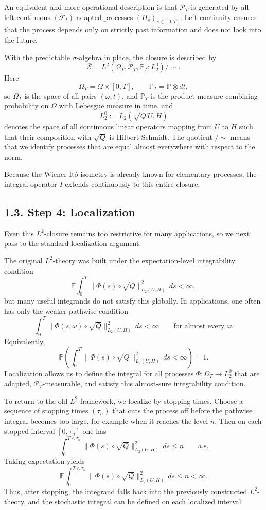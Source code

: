 \documentclass[11pt]{article}
\theoremstyle{definition}
\theoremstyle{remark}
\begin{document}
An equivalent and more operational description is that \(\mathcal P_T\) is generated by all left-continuous \((\mathcal F_t)\)-adapted processes \((H_s)_{s\in[0,T]}\). Left-continuity ensures that the process depends only on strictly past information and does not look into the future.

With the predictable \(\sigma\)-algebra in place, the closure is described by
\[
\overline{\mathcal E}
=
L^2(\Omega_T,\mathcal P_T,\mathbb P_T;L_2^0)/\sim.
\]
Here
\[
\Omega_T=\Omega\times[0,T],
\qquad
\mathbb P_T=\mathbb P\otimes dt,
\]
so \(\Omega_T\) is the space of all pairs \((\omega,t)\), and \(\mathbb P_T\) is the product measure combining probability on \(\Omega\) with Lebesgue measure in time.
and
\[
L_2^0
:=
L_2(\sqrt Q\,U,H)
\]
denotes the space of all continuous linear operators mapping from \(U\) to \(H\) such that their composition with \(\sqrt Q\) is Hilbert-Schmidt. The quotient \(/\sim\) means that we identify processes that are equal almost everywhere with respect to the norm.

Because the Wiener-It\^o isometry is already known for elementary processes, the integral operator \(I\) extends continuously to this entire closure.

\subsection*{1.3. Step 4: Localization}
Even this \(L^2\)-closure remains too restrictive for many applications, so we next pass to the standard localization argument.

The original \(L^2\)-theory was built under the expectation-level integrability condition
\[
\mathbb E\int_0^T \|\Phi(s)\circ \sqrt Q\|_{L_2(U,H)}^2\,ds<\infty,
\]
but many useful integrands do not satisfy this globally. In applications, one often has only the weaker pathwise condition
\[
\int_0^T \|\Phi(s,\omega)\circ \sqrt Q\|_{L_2(U,H)}^2\,ds<\infty
\qquad \text{for almost every } \omega.
\]
Equivalently,
\[
\mathbb P\left(\int_0^T \|\Phi(s)\circ \sqrt Q\|_{L_2(U,H)}^2\,ds<\infty\right)=1.
\]
Localization allows us to define the integral for all processes \(\Phi:\Omega_T\to L_2^0\) that are adapted, \(\mathcal P_T\)-measurable, and satisfy this almost-sure integrability condition.

To return to the old \(L^2\)-framework, we localize by stopping times. Choose a sequence of stopping times \((\tau_n)\) that cuts the process off before the pathwise integral becomes too large, for example when it reaches the level \(n\). Then on each stopped interval \([0,\tau_n]\) one has
\[
\int_0^{T\wedge \tau_n} \|\Phi(s)\circ \sqrt Q\|_{L_2(U,H)}^2\,ds\le n
\qquad \text{a.s.}
\]
Taking expectation yields
\[
\mathbb E\int_0^{T\wedge \tau_n} \|\Phi(s)\circ \sqrt Q\|_{L_2(U,H)}^2\,ds\le n<\infty.
\]
Thus, after stopping, the integrand falls back into the previously constructed \(L^2\)-theory, and the stochastic integral can be defined on each localized interval.
\end{document}
